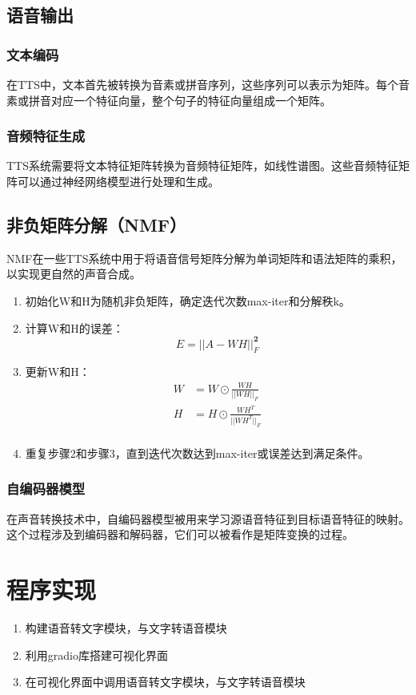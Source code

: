 \documentclass{article}
\begin{document}
\subsection{语音输出}
\subsubsection{文本编码}{在TTS中，文本首先被转换为音素或拼音序列，这些序列可以表示为矩阵。每个音素或拼音对应一个特征向量，整个句子的特征向量组成一个矩阵。}
\subsubsection{音频特征生成}{TTS系统需要将文本特征矩阵转换为音频特征矩阵，如线性谱图。这些音频特征矩阵可以通过神经网络模型进行处理和生成。}
\subsection{非负矩阵分解（NMF）}
{NMF在一些TTS系统中用于将语音信号矩阵分解为单词矩阵和语法矩阵的乘积，以实现更自然的声音合成。
\begin{enumerate}
    \item 初始化W和H为随机非负矩阵，确定迭代次数max-iter和分解秩k。
    \item 计算W和H的误差：
    $$
E=\left| \left| A-WH \right| \right|_{F}^{\mathbf{2}}
$$
    \item 更新W和H：
    $$
\begin{aligned}
	W&=W\odot \frac{WH}{||WH||_{F}}\\
	H&=H\odot \frac{WH^{T}}{||WH^{T}||_{F}}\\
\end{aligned}
$$

    \item 重复步骤2和步骤3，直到迭代次数达到max-iter或误差达到满足条件。
\end{enumerate}
} 
\subsubsection{自编码器模型}{在声音转换技术中，自编码器模型被用来学习源语音特征到目标语音特征的映射。这个过程涉及到编码器和解码器，它们可以被看作是矩阵变换的过程。}
\section{程序实现}{
\begin{enumerate}
    \item 构建语音转文字模块，与文字转语音模块
    \item 利用gradio库搭建可视化界面
    \item 在可视化界面中调用语音转文字模块，与文字转语音模块
\end{enumerate}
}
\end{document}
